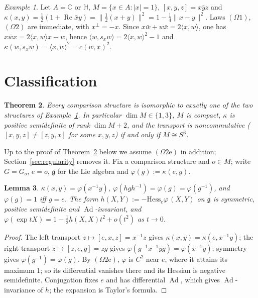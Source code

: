 \documentclass[11pt,reqno]{amsart}
\newtheorem{theorem}{Theorem}[section]
\newtheorem{lemma}[theorem]{Lemma}
\theoremstyle{definition}
\theoremstyle{remark}
\newtheorem{example}[theorem]{Example}
\numberwithin{equation}{section}
\newcommand{\C}{\mathbb{C}}
\newcommand{\HH}{\mathbb{H}}
\newcommand{\g}{\mathfrak{g}}
\newcommand{\Ad}{\operatorname{Ad}}
\newcommand{\re}{\operatorname{Re}}
\newcommand{\ip}[2]{\langle #1,#2\rangle}
\newcommand{\hp}[3]{[#1,#2,#3]}
\begin{document}
\begin{example}\label{ex:models}
Let $A=\C$ or $\HH$, $M=\{x\in A:\lvert x\rvert=1\}$, $\hp xyz=x\bar yz$ and
$\kappa(x,y)=\tfrac12(1+\re\bar xy)=\lVert\tfrac12(x+y)\rVert^2=1-\tfrac14\lVert x-y\rVert^2$.  Laws
$(\Omega1)$, $(\Omega2)$ are immediate, with $x^\perp=-x$.  Since $x\bar w+w\bar x=2\ip xw$, one has
$x\bar wx=2\ip xw x-w$, hence $\ip w{s_xw}=2\ip xw^2-1$ and $\kappa(w,s_xw)=\ip xw^2=c(w,x)^2$.
\end{example}

\section{Classification}\label{sec:class}

\begin{theorem}\label{thm:main}
Every comparison structure is isomorphic to exactly one of the two structures of
Example~\ref{ex:models}.  In particular $\dim M\in\{1,3\}$, $M$ is compact, $\kappa$ is positive
semidefinite of rank $\dim M+2$, and the transport is noncommutative ($\hp xyz\ne\hp zyx$ for some
$x,y,z$) if and only if $M\cong S^3$.
\end{theorem}

Up to the proof of Theorem~\ref{thm:main} below we assume $(\Omega2\mathrm e)$ in addition; Section~\ref{sec:regularity} removes it.
Fix a comparison structure and $o\in M$; write $G=G_o$, $e=o$, $\g$ for the Lie algebra and
$\varphi(g):=\kappa(e,g)$.

\begin{lemma}\label{lem:class}
$\kappa(x,y)=\varphi(x^{-1}y)$, $\varphi(hgh^{-1})=\varphi(g)=\varphi(g^{-1})$, and $\varphi(g)=1$ iff
$g=e$.  The form $h(X,Y):=-\mathrm{Hess}_e\varphi\,(X,Y)$ on $\g$ is symmetric, positive semidefinite and
$\Ad$-invariant, and $\varphi(\exp tX)=1-\tfrac12h(X,X)t^2+o(t^2)$ as $t\to0$.
\end{lemma}
\begin{proof}
The left transport $z\mapsto\hp exz=x^{-1}z$ gives $\kappa(x,y)=\kappa(e,x^{-1}y)$; the right transport
$z\mapsto\hp zeg=zg$ gives $\varphi(g^{-1}x^{-1}yg)=\varphi(x^{-1}y)$; symmetry gives
$\varphi(g^{-1})=\varphi(g)$.  By $(\Omega2\mathrm e)$, $\varphi$ is $C^2$ near $e$, where it attains its
maximum $1$; so its differential vanishes there and its Hessian is negative semidefinite.  Conjugation
fixes $e$ and has differential $\Ad$, which gives $\Ad$-invariance of $h$; the expansion is Taylor's
formula.
\end{proof}
\end{document}

